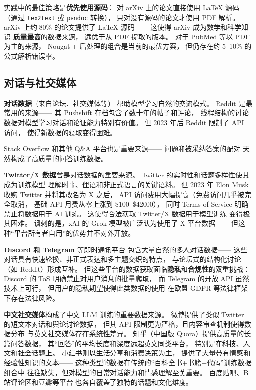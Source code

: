 实践中的最佳策略是\textbf{优先使用源码}：
对 arXiv 上的论文直接使用 \LaTeX{} 源码
（通过 \texttt{tex2text} 或 \texttt{pandoc} 转换），
只对没有源码的论文才使用 PDF 解析。
arXiv 上约 80\% 的论文提供了 \LaTeX{} 源码——
这使得 arXiv 成为数学和科学知识
\textbf{质量最高}的数据来源，
远优于从 PDF 提取的版本。
对于 PubMed 等以 PDF 为主的来源，
Nougat + 后处理的组合是当前的最优方案，
但仍存在约 5--10\% 的公式解析错误率。

\subsection{对话与社交媒体}

\textbf{对话数据}（来自论坛、社交媒体等）
帮助模型学习自然的交流模式。
Reddit 是最常用的来源——
其 Pushshift 存档包含了数十年的帖子和评论，
线程结构的讨论数据对模型学习对话和论证能力特别有价值。
但 2023 年后 Reddit 限制了 API 访问，
使得新数据的获取变得困难。

Stack Overflow 和其他 Q\&A 平台也是重要来源——
问题和被采纳答案的配对
天然构成了高质量的问答训练数据。

\textbf{Twitter/X 数据}曾是对话数据的重要来源。
Twitter 的实时性和话题多样性使其成为训练模型
理解时事、俚语和非正式语言的关键语料。
但 2023 年 Elon Musk 收购 Twitter 并将其改名为 X 之后，
API 访问费用大幅提高（免费访问几乎被完全取消，
基础 API 月费从零上涨到 \$100--\$42000），
同时 Terms of Service 明确禁止将数据用于 AI 训练。
这使得合法获取 Twitter/X 数据用于模型训练
变得极其困难。
讽刺的是，xAI 的 Grok 模型被广泛认为使用了 X 平台数据——
但这种``平台所有者自用''的优势并不对外开放。

\textbf{Discord 和 Telegram} 等即时通讯平台
包含大量自然的多人对话数据——
这些对话具有快速轮换、非正式表达和多主题交织的特点，
与论坛式的结构化讨论（如 Reddit）形成互补。
但这些平台的数据获取面临\textbf{隐私}和\textbf{合规性}的双重挑战：
Discord 的 ToS 明确禁止对用户消息的批量爬取，
而 Telegram 的开放 API 虽然技术上可行，
但用户的隐私期望使得此类数据的使用
在欧盟 GDPR 等法律框架下存在法律风险。

\textbf{中文社交媒体}构成了中文 LLM 训练的重要数据来源。
微博提供了类似 Twitter 的短文本对话和舆论讨论数据，
但其 API 限制更为严格，且内容审查机制使得数据分布
与英文社交媒体存在系统性差异。
知乎（中国版 Quora）提供高质量的长篇问答数据，
其``回答''的平均长度和深度远超英文同类平台，
特别是在科技、人文和社会话题上。
小红书则以生活分享和消费决策为主，
提供了大量带有情感和经验性知识的文本——
这种类型的数据在传统的``百科全书+书籍+代码''训练数据组合中
往往缺失，但对模型的日常对话能力和情感理解至关重要。
百度贴吧、B 站评论区和豆瓣等平台
也各自覆盖了独特的话题和文化维度。

